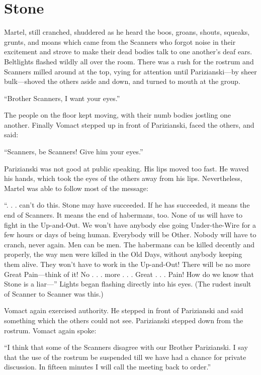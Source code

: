  
\section{Stone}

Martel, still cranched, shuddered as he heard the boos, groans, shouts, squeaks, grunts, and moans which came from the Scanners who forgot noise in their excitement and strove to make their dead bodies talk to one another's deaf ears. Beltlights flashed wildly all over the room. There was a rush for the rostrum and Scanners milled around at the top, vying for attention until Parizianski---by sheer bulk---shoved the others aside and down, and turned to mouth at the group.

``Brother Scanners, I want your eyes.''

The people on the floor kept moving, with their numb bodies jostling one another. Finally Vomact stepped up in front of Parizianski, faced the others, and said:

``Scanners, be Scanners! Give him your eyes.''

Parizianski was not good at public speaking. His lips moved too fast. He waved his hands, which took the eyes of the others away from his lips. Nevertheless, Martel was able to follow most of the message:

``. . . can't do this. Stone may have succeeded. If he has succeeded, it means the end of Scanners. It means the end of habermans, too. None of us will have to fight in the Up-and-Out. We won't have anybody else going Under-the-Wire for a few hours or days of being human. Everybody will be Other. Nobody will have to cranch, never again. Men can be men. The habermans can be killed decently and properly, the way men were killed in the Old Days, without anybody keeping them alive. They won't have to work in the Up-and-Out! There will be no more Great Pain---think of it! No . . . more . . . Great . . . Pain! How do we know that Stone is a liar---'' Lights began flashing directly into his eyes. (The rudest insult of Scanner to Scanner was this.)

Vomact again exercised authority. He stepped in front of Parizianski and said something which the others could not see. Parizianski stepped down from the rostrum. Vomact again spoke:

``I think that some of the Scanners disagree with our Brother Parizianski. I say that the use of the rostrum be suspended till we have had a chance for private discussion. In fifteen minutes I will call the meeting back to order.''


